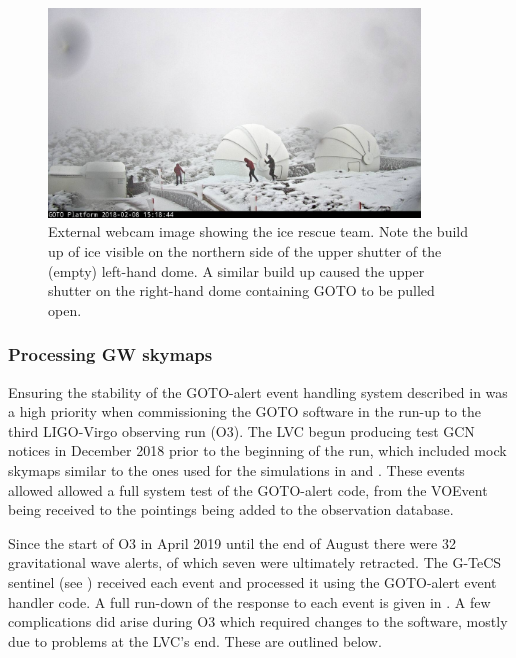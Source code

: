 \begin{colsection}
\begin{colsection}
\begin{figure}[p]
    \begin{center}
    \includegraphics[width=0.88\textwidth]{images/ice_outside.jpeg}
    \end{center}
    \caption[External webcam image showing the ice rescue team]{
        External webcam image showing the ice rescue team. Note the build up of ice visible on the northern side of the upper shutter of the (empty) left-hand dome. A similar build up caused the upper shutter on the right-hand dome containing GOTO to be pulled open.
    }\label{fig:ice_external}
\end{figure}

\clearpage

\subsubsection{Processing GW skymaps}

Ensuring the stability of the GOTO-alert event handling system described in  was a high priority when commissioning the GOTO software in the run-up to the third LIGO-Virgo observing run (O3). The LVC begun producing test GCN notices in December 2018 prior to the beginning of the run, which included mock skymaps similar to the ones used for the simulations in  and . These events allowed allowed a full system test of the GOTO-alert code, from the VOEvent being received to the pointings being added to the observation database.

Since the start of O3 in April 2019 until the end of August there were 32 gravitational wave alerts, of which seven were ultimately retracted. The G-TeCS sentinel (see ) received each event and processed it using the GOTO-alert event handler code. A full run-down of the response to each event is given in . A few complications did arise during O3 which required changes to the software, mostly due to problems at the LVC's end. These are outlined below.


\end{colsection}
\end{colsection}
